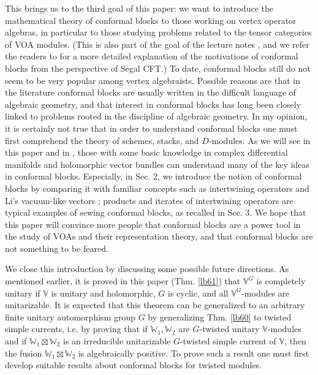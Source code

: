 \documentclass[11pt,b5paper,notitlepage]{article}
\theoremstyle{definition}
\theoremstyle{plain}
\newcommand{\Vbb}{\mathbb V}
\newcommand{\Wbb}{\mathbb W}
\numberwithin{equation}{section}
\begin{document}
This brings us to the third goal of this paper: we want to introduce the mathematical theory of conformal blocks to those working on vertex operator algebras, in particular to those studying problems related to the tensor categories of VOA modules. (This is also part of the goal of the lecture notes \cite{Gui23b}, and we refer the readers to \cite{Gui23b} for a more detailed explanation of the motivations of conformal blocks from the perspective of Segal CFT.) To date, conformal blocks still do not seem to be very popular among vertex algebraists. Possible reasons are that in the literature conformal blocks are usually written in the difficult language of algebraic geometry, and that interest in conformal blocks has long been closely linked to problems rooted in the discipline of algebraic geometry. In my opinion, it is certainly not true that in order to understand conformal blocks one must first comprehend the theory of schemes, stacks, and $D$-modules. As we will see in this paper and in \cite{Gui23b}, those with some basic knowledge in complex differential manifolds and holomorphic vector bundles can understand many of the key ideas in conformal blocks. Especially, in Sec. 2, we introduce the notion of conformal blocks by comparing it with familiar concepts such as intertwining operators and Li's vacuum-like vectors \cite{Li94}; products and iterates of intertwining operators are typical examples of sewing conformal blocks, as recalled in Sec. 3. We hope that this paper will convince more people that conformal blocks are a power tool in the study of VOAs and their representation theory, and that conformal blocks are not something to be feared.

We close this introduction by discussing some possible future directions. As mentioned earlier, it is proved in this paper (Thm. \ref{lb61}) that $\Vbb^G$ is completely unitary if $\Vbb$ is unitary and holomorphic, $G$ is cyclic, and all $\Vbb^G$-modules are unitarizable. It is expected that this theorem can be generalized to an arbitrary finite unitary automorphism group $G$ by generalizing Thm. \ref{lb60} to twisted simple currents, i.e. by proving that if $\Wbb_1,\Wbb_2$ are $G$-twisted unitary $\Vbb$-modules and if $\Wbb_1\boxtimes\Wbb_2$ is an irreducible unitarizable $G$-twisted simple current of $\Vbb$, then the fusion $\Wbb_1\boxtimes\Wbb_2$ is algebraically positive. To prove such a result one must first develop suitable results about conformal blocks for twisted modules.
\end{document}
